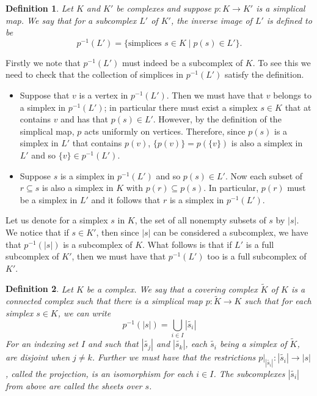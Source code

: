 \documentclass[12pt]{article}
\newtheorem{definition}{Definition}
\theoremstyle{definition}
\numberwithin{equation}{theorem}
\begin{document}
\begin{definition}
  Let $K$ and $K'$ be complexes and suppose $p: K \rightarrow K'$ is a simplical map. We say that for a subcomplex $L'$ of $K'$, the \emph{inverse image} of $L'$ is defined to be
  \begin{equation*}
    p^{-1}(L') = \{ \text{simplices } s \in K \mid p(s) \in L' \}.
  \end{equation*}
\end{definition}

Firstly we note that $p^{-1}(L')$ must indeed be a subcomplex of $K$. To see this we need to check that the collection of simplices in $p^{-1}(L')$ satisfy the definition.

\begin{itemize}
\item Suppose that $v$ is a vertex in $p^{-1}(L')$. Then we must have that $v$ belongs to a simplex in $p^{-1}(L')$; in particular there must exist a simplex $s \in K$ that at contains $v$ and has that $p(s) \in L'$. However, by the definition of the simplical map, $p$ acts uniformly on vertices. Therefore, since $p(s)$ is a simplex in $L'$ that contains $p(v)$, $\{ p(v) \} = p(\{ v \})$ is also a simplex in $L'$ and so $\{ v \} \in p^{-1}(L')$.
\item Suppose $s$ is a simplex in $p^{-1}(L')$ and so $p(s) \in L'$. Now each subset of $r \subseteq s$ is also a simplex in $K$ with $p(r) \subseteq p(s)$. In particular, $p(r)$ must be a simplex in $L'$ and it follows that $r$ is a simplex in $p^{-1}(L')$.
\end{itemize}

Let us denote for a simplex $s$ in $K$, the set of all nonempty subsets of $s$ by $|s|$. We notice that if $s \in K'$, then since $|s|$ can be considered a subcomplex, we have that $p^{-1}(|s|)$ is a subcomplex of $K$. What follows is that if $L'$ is a full subcomplex of $K'$, then we must have that $p^{-1}(L')$ too is a full subcomplex of $K'$.
\begin{definition}
  Let $K$ be a complex. We say that a \emph{covering complex} $\tilde{K}$  of $K$ is a connected complex such that there is a simplical map $p:\tilde{K} \rightarrow K$ such that for each simplex $s \in K$, we can write
  \begin{equation*}
    p^{-1}(|s|) = \bigcup_{i \in I} |\tilde{s_i}|
  \end{equation*}
  For an indexing set $I$ and such that $|\tilde{s_j}|$ and $|\tilde{s_k}|$, each $\tilde{s_i}$ being a simplex of $\tilde{K}$, are disjoint when $j \neq k$. Further we must have that the restrictions $p \vert_{|\tilde{s_i}|} : |\tilde{s_i}| \rightarrow |s|$, called the \emph{projection}, is an isomorphism for each $i \in I$. The subcomplexes $|\tilde{s_i}|$ from above are called the \emph{sheets} over $s$.
\end{definition}
\end{document}
